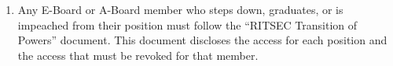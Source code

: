 

\begin{enumerate}
  \item Any E-Board or A-Board member who steps down, graduates, or is
    impeached from their position must follow the “RITSEC Transition of Powers”
    document. This document discloses the access for each position and the
    access that must be revoked for that member. 
\end{enumerate}